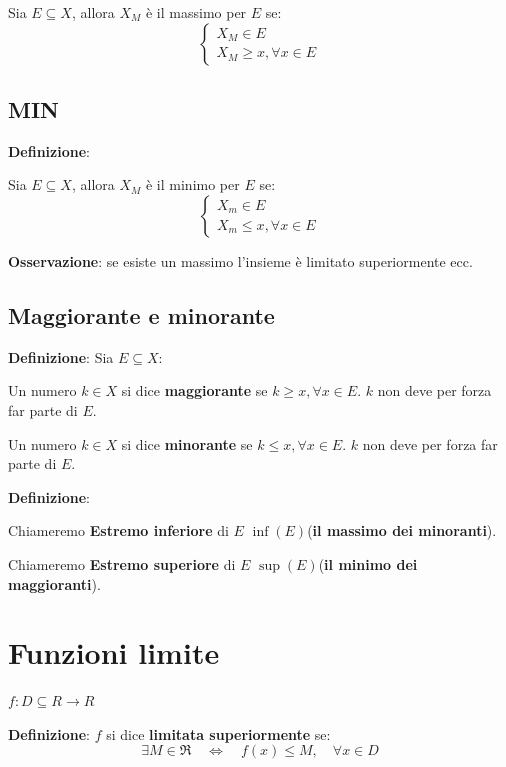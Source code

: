 \documentclass{article}
\begin{document}
Sia $E \subseteq X$, allora $X_M$ è il massimo per $E$ se:
\begin{equation*}
    \begin{cases}
        X_M \in E \\
        X_M \geq x, \forall x \in E
    \end{cases}
\end{equation*}

\subsection{MIN}
\textbf{Definizione}:

Sia $E \subseteq X$, allora $X_M$ è il minimo per $E$ se:
\begin{equation*}
    \begin{cases}
        X_m \in E \\
        X_m \leq x, \forall x \in E
    \end{cases}
\end{equation*}

\textbf{Osservazione}: se esiste un massimo l'insieme è limitato superiormente ecc.

\subsection{Maggiorante e minorante}

\textbf{Definizione}:
Sia $E \subseteq X$:

Un numero $k \in X$ si dice \textbf{maggiorante} se $k \geq x, \forall x \in E$.
$k$ non deve per forza far parte di $E$.



Un numero $k \in X$ si dice \textbf{minorante} se $k \leq x, \forall x \in E$.
$k$ non deve per forza far parte di $E$.



\textbf{Definizione}:

Chiameremo \textbf{Estremo inferiore} di $E$ $\inf(E)$(\textbf{il massimo dei minoranti}).


Chiameremo \textbf{Estremo superiore} di $E$ $\sup(E)$(\textbf{il minimo dei maggioranti}).


\section{Funzioni limite}

$f: D \subseteq R \rightarrow R$

\textbf{Definizione}:
$f$ si dice \textbf{limitata superiormente} se:
\begin{equation*}
    \exists M \in \Re \quad \Leftrightarrow \quad f(x) \leq M, \quad \forall x \in D
\end{equation*}
\end{document}
